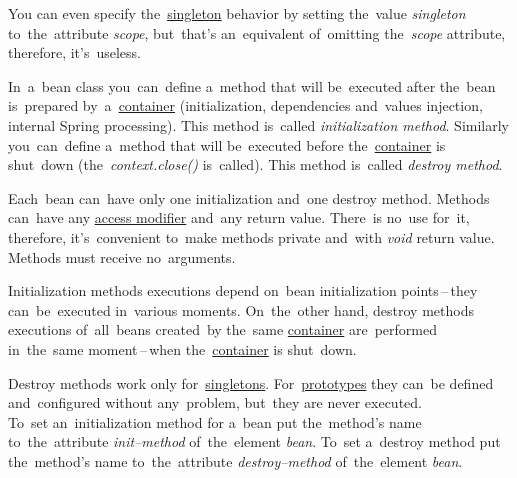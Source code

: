 \note You can even specify the~\hyperref[singletondp]{singleton} behavior by setting the~value \textit{singleton} to~the~attribute \textit{scope}, but~that's an~equivalent of~omitting the~\textit{scope} attribute, therefore, it's~useless.

In~a~bean class you~can~define a~method that will be~executed after the~bean is~prepared by~a~\hyperref[springcontainrer]{container} (initialization, dependencies and~values injection, internal Spring processing). This method is~called \textit{initialization method}. Similarly you~can~define a~method that will be~executed before the~\hyperref[springcontainrer]{container} is shut~down (the~\textit{context.close()} is~called). This method is~called \textit{destroy method}.

Each~bean can~have only one initialization and~one destroy method. Methods can~have any \hyperref[accessmodifiers]{access modifier} and~any return value. There~is no~use for~it, therefore, it's~convenient to~make methods private and~with \textit{void} return value. Methods must receive no~arguments.

Initialization methods executions depend on~bean initialization points\,--\,they can~be~executed in~various moments. On~the~other hand, destroy methods executions of~all~beans created~by the~same \hyperref[springcontainrer]{container} are~performed in~the~same moment\,--\,when the~\hyperref[springcontainrer]{container} is shut~down.

\warning Destroy methods work only for~\hyperref[singletondp]{singletons}. For~\hyperref[prototypedp]{prototypes} they can~be defined and~configured without any~problem, but~they are never executed.\\

\noindent To~set an~initialization method for a~bean put the~method's name to~the~attribute \textit{init--method} of~the~element \textit{bean}. To~set a~destroy method put the~method's name to~the~attribute \textit{destroy--method} of~the~element \textit{bean}.
\newpage

